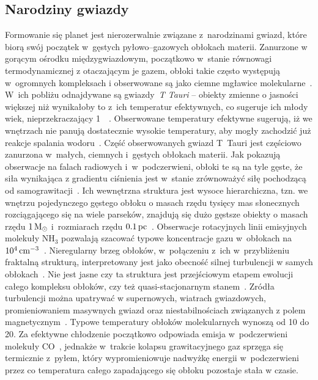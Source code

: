 \subsection{Narodziny gwiazdy}
Formowanie się planet jest nierozerwalnie związane z~narodzinami gwiazd, które
biorą swój początek w~gęstych pyłowo--gazowych obłokach materii. Zanurzone w
gorącym ośrodku międzygwiazdowym, początkowo w~stanie równowagi termodynamicznej
z otaczającym je gazem, obłoki takie często występują w~ogromnych kompleksach i
obserwowane są jako ciemne mgławice molekularne~\cite{Tielens05}. W~ich pobliżu
odnajdywane są gwiazdy~\emph{T Tauri} -- obiekty zmienne o jasności większej niż
wynikałoby to z~ich temperatur efektywnych, co sugeruje ich młody wiek,
nieprzekraczający 1~\Myr~\cite{H62}. Obserwowane temperatury efektywne sugerują,
iż we wnętrzach nie panują dostatecznie wysokie temperatury, aby mogły zachodzić
już reakcje spalania wodoru~\cite{CK79}. Część obserwowanych gwiazd T~Tauri jest
częściowo zanurzona w~małych, ciemnych i~gęstych obłokach materii. Jak pokazują
obserwacje na falach radiowych i~w~podczerwieni, obłoki te są na tyle gęste, że
siła wynikająca z gradientu ciśnienia jest w~stanie zrównoważyć siłę pochodzącą
od samograwitacji~\cite{WT02}. Ich wewnętrzna struktura jest wysoce
hierarchiczna, tzn. we wnętrzu pojedynczego gęstego obłoku o masach rzędu
tysięcy mas słonecznych rozciągającego się na wiele parseków, znajdują się dużo
gęstsze obiekty o masach rzędu $1\hbox{$\mathrm{\thinspace M_{\odot}}$}$ i~rozmiarach rzędu $0.1\hbox{$\thinspace\textrm{pc}$}$~\cite{M85,
LSM93}. Obserwacje rotacyjnych linii emisyjnych molekuły NH$_3$ pozwalają
szacować typowe koncentracje gazu w~obłokach na $10^{4}\hbox{$\thinspace\textrm{cm}$}^{-3}$~\cite{BM89}.
Nieregularny brzeg obłoków, w~połączeniu z~ich w~przybliżeniu fraktalną
strukturą, interpretowany jest jako obecność silnej turbulencji w samych
obłokach~\cite{E00, FPW91}. Nie jest jasne czy ta struktura jest przejściowym
etapem ewolucji całego kompleksu obłoków, czy też quasi-stacjonarnym
stanem~\cite{L94}. Zródła turbulencji można upatrywać w supernowych, wiatrach
gwiazdowych, promieniowaniem masywnych gwiazd oraz niestabilnościach związanych
z polem magnetycznym~\cite{NP03, MLK04}. 
Typowe temperatury obłoków molekularnych wynoszą od
10 do 20\K. Za efektywne chłodzenie początkowo odpowiada emisja w~podczerwieni
molekuły CO~\cite{MSWG82}, jednakże w~trakcie kolapsu grawitacyjnego gaz sprzęga
się termicznie z~pyłem, który wypromieniowuje nadwyżkę energii
w~podczerwieni~\cite{HN65, MI00} przez co temperatura całego zapadającego się
obłoku pozostaje stała w czasie.

